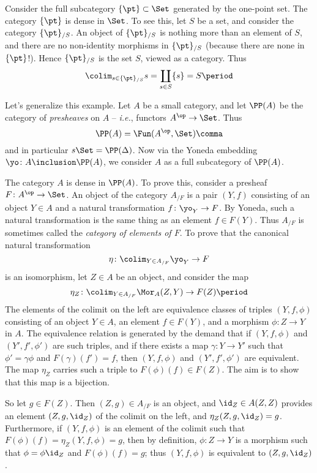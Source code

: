 \begin{eg}
  Consider the full subcategory $\{\pt\} \subset \Set$ generated by the one-point set.
  The category $\{\pt\}$ is dense in $\Set$.
  To see this, let $S$ be a set, and
  consider the category $\{\pt\}_{/S}$.
  An object of $\{\pt\}_{/S}$ is nothing more than an element of $S$,
  and there are no non-identity morphisms in $\{\pt\}_{/S}$ (because there are none in $\{\pt\}$!).
  Hence $\{\pt\}_{/S}$ is the set $S$, viewed as a category.
  Thus
  \[
    \colim_{s \in \{\pt\}_{/S}} s = \coprod_{s \in S} \{s\} = S \period
  \]
\end{eg}

\begin{eg}
  Let's generalize this example.
  Let $A$ be a small category, and let $\PP(A)$ be the category of \emph{presheaves} on $A$ --
  \emph{i.e.}, functors $A^{\op} \to \Set$.
  Thus
  \[
    \PP(A) = \Fun(A^{\op}, \Set) \comma
  \]
  and in particular $s\Set = \PP(\Delta)$.
  Now via the Yoneda embedding $\yo \colon A \inclusion \PP(A)$, we consider $A$ as a full subcategory of $\PP(A)$.

  The category $A$ is dense in $\PP(A)$.
  To prove this, consider a presheaf $F \colon A^{\op} \to \Set$.
  An object of the category $A_{/F}$ is a pair $(Y,f)$ consisting of an object $Y \in A$ and a natural transformation $f \colon \yo_Y \to F$.
  By Yoneda, such a natural transformation is the same thing as an element $f \in F(Y)$.
  Thus $A_{/F}$ is sometimes called the \emph{category of elements of $F$}.
  To prove that the canonical natural transformation
  \[
    \eta \colon \colim_{Y \in A_{/F}} \yo_Y \to F
  \]
  is an isomorphism, let $Z \in A$ be an object, and consider the map
  \[
    \eta_Z \colon \colim_{Y \in A_{/F}} \Mor_A(Z,Y) \to F(Z) \period
  \]
  The elements of the colimit on the left are equivalence classes of triples $(Y,f,\phi)$ consisting of an object $Y \in A$, an element $f \in F(Y)$, and a morphism $\phi \colon Z \to Y$ in $A$.
  The equivalence relation is generated by the demand that if $(Y,f,\phi)$ and $(Y',f',\phi')$ are such triples, and if there exists a map $\gamma \colon Y \to Y'$ such that $\phi' = \gamma\phi$ and $F(\gamma)(f') = f$, then $(Y,f,\phi)$ and $(Y',f',\phi')$ are equivalent.
  The map $\eta_Z$ carries such a triple to $F(\phi)(f) \in F(Z)$.
  The aim is to show that this map is a bijection.

  So let $g \in F(Z)$.
  Then $(Z,g) \in A_{/F}$ is an object, and $\id_Z \in A(Z,Z)$ provides an element $(Z,g,\id_Z)$ of the colimit on the left, and $\eta_Z(Z,g,\id_Z) = g$.
  Furthermore, if $(Y,f,\phi)$ is an element of the colimit such that $F(\phi)(f) = \eta_Z(Y,f,\phi) = g$, then
  by definition, $\phi \colon Z \to Y$ is a morphism such that $\phi = \phi \id_Z$ and $F(\phi)(f) = g$;
  thus $(Y,f,\phi)$ is equivalent to $(Z,g,\id_Z)$.
\end{eg}

